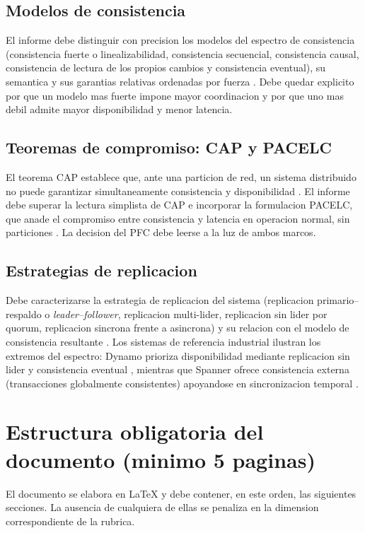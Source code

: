 \documentclass[11pt,a4paper]{article}
\begin{document}
\subsection{Modelos de consistencia}
El informe debe distinguir con precision los modelos del espectro de consistencia (consistencia fuerte o linealizabilidad, consistencia secuencial, consistencia causal, consistencia de lectura de los propios cambios y consistencia eventual), su semantica y sus garantias relativas ordenadas por fuerza \parencite{ViottiVukolic2016Consistency,VanSteenTanenbaum2017DS}. Debe quedar explicito por que un modelo mas fuerte impone mayor coordinacion y por que uno mas debil admite mayor disponibilidad y menor latencia.

\subsection{Teoremas de compromiso: CAP y PACELC}
El teorema CAP establece que, ante una particion de red, un sistema distribuido no puede garantizar simultaneamente consistencia y disponibilidad \parencite{GilbertLynch2002CAP}. El informe debe superar la lectura simplista de CAP e incorporar la formulacion PACELC, que anade el compromiso entre consistencia y latencia en operacion normal, sin particiones \parencite{Abadi2012PACELC}. La decision del PFC debe leerse a la luz de ambos marcos.

\subsection{Estrategias de replicacion}
Debe caracterizarse la estrategia de replicacion del sistema (replicacion primario--respaldo o \emph{leader--follower}, replicacion multi-lider, replicacion sin lider por quorum, replicacion sincrona frente a asincrona) y su relacion con el modelo de consistencia resultante \parencite{VanSteenTanenbaum2017DS}. Los sistemas de referencia industrial ilustran los extremos del espectro: Dynamo prioriza disponibilidad mediante replicacion sin lider y consistencia eventual \parencite{DeCandia2007Dynamo}, mientras que Spanner ofrece consistencia externa (transacciones globalmente consistentes) apoyandose en sincronizacion temporal \parencite{Corbett2013Spanner}.

\section{Estructura obligatoria del documento (minimo 5 paginas)}
El documento se elabora en LaTeX y debe contener, en este orden, las siguientes secciones. La ausencia de cualquiera de ellas se penaliza en la dimension correspondiente de la rubrica.
\end{document}
